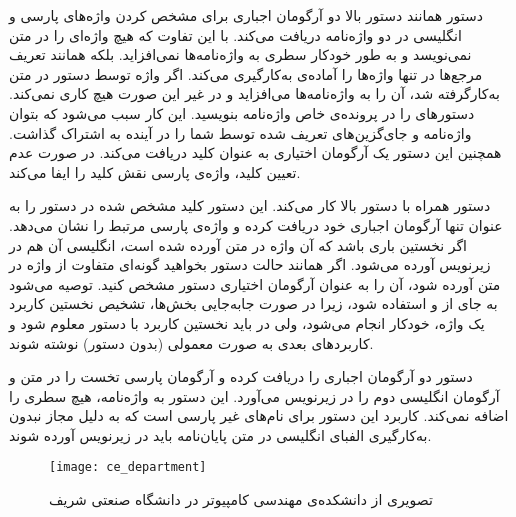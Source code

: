 	 دستور  همانند دستور بالا دو آرگومان اجباری برای مشخص کردن واژه‌های پارسی و انگلیسی در دو واژه‌نامه دریافت می‌کند. با این تفاوت که هیچ واژه‌ای را در متن نمی‌نویسد و به طور خودکار سطری به واژه‌نامه‌ها نمی‌افزاید. بلکه همانند تعریف مرجع‌ها در  تنها واژه‌ها را آماده‌ی به‌کارگیری می‌کند. اگر واژه توسط دستور  در متن به‌کارگرفته شد، آن را به واژه‌نامه‌ها می‌افزاید و در غیر این صورت هیچ کاری نمی‌کند. دستورهای  را در پرونده‌ی خاص واژه‌نامه بنویسید. این کار سبب می‌شود که بتوان واژه‌نامه و جای‌گزین‌های تعریف شده توسط شما را در آینده به اشتراک گذاشت. همچنین این دستور یک آرگومان اختیاری به عنوان کلید دریافت می‌کند. در صورت عدم تعیین کلید، واژه‌ی پارسی نقش کلید را ایفا می‌کند.
	
	 دستور  همراه با دستور بالا کار می‌کند. این دستور کلید مشخص شده در دستور  را به عنوان تنها آرگومان اجباری خود دریافت کرده و واژه‌ی پارسی مرتبط را نشان می‌دهد. اگر نخستین باری باشد که آن واژه در متن آورده شده است، انگلیسی آن هم در زیرنویس آورده می‌شود. اگر همانند حالت دستور  بخواهید گونه‌ای متفاوت از واژه در متن آورده شود، آن را به عنوان آرگومان اختیاری دستور  مشخص کنید. توصیه می‌شود به جای  از  و  استفاده شود، زیرا در صورت جابه‌جایی بخش‌ها، تشخیص نخستین کاربرد یک واژه، خودکار انجام می‌شود، ولی در  باید نخستین کاربرد با دستور  معلوم شود و کاربردهای بعدی به صورت معمولی (بدون دستور) نوشته شوند.
	
	 دستور  دو آرگومان اجباری را دریافت کرده و آرگومان پارسی تخست را در متن و آرگومان انگلیسی دوم را در زیرنویس  می‌آورد. این دستور به واژه‌نامه، هیچ سطری را اضافه نمی‌کند. کاربرد این دستور برای نام‌های غیر پارسی است که به دلیل مجاز نبدون به‌کارگیری الفبای انگلیسی در متن پایان‌نامه باید در زیرنویس آورده شوند.


\begin{figure}[tbp]
\centering
\texttt{[image: ce\_department]}
\def\mytempcaption{تصویری از دانشکده‌ی مهندسی کامپیوتر در دانشگاه صنعتی شریف}
\caption[\mytempcaption]{\mytempcaption~\cite{sharif:cesite}}
\label{fig:cedepartment}
\end{figure}


